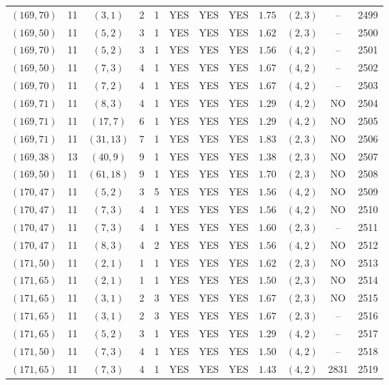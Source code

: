 \begin{longtable}{|c|c|c|c|c|c|c|c|c|c|c|c|}
$(169,70)$ & 11 & $(3,1)$ & 2 & 1 & YES & YES & YES & $1.75$ & $(2,3)$ & -- & 2499\\
$(169,50)$ & 11 & $(5,2)$ & 3 & 1 & YES & YES & YES & $1.62$ & $(2,3)$ & -- & 2500\\
$(169,70)$ & 11 & $(5,2)$ & 3 & 1 & YES & YES & YES & $1.56$ & $(4,2)$ & -- & 2501\\
$(169,50)$ & 11 & $(7,3)$ & 4 & 1 & YES & YES & YES & $1.67$ & $(4,2)$ & -- & 2502\\
$(169,70)$ & 11 & $(7,2)$ & 4 & 1 & YES & YES & YES & $1.67$ & $(4,2)$ & -- & 2503\\
$(169,71)$ & 11 & $(8,3)$ & 4 & 1 & YES & YES & YES & $1.29$ & $(4,2)$ & NO & 2504\\
$(169,71)$ & 11 & $(17,7)$ & 6 & 1 & YES & YES & YES & $1.29$ & $(4,2)$ & NO & 2505\\
$(169,71)$ & 11 & $(31,13)$ & 7 & 1 & YES & YES & YES & $1.83$ & $(2,3)$ & NO & 2506\\
$(169,38)$ & 13 & $(40,9)$ & 9 & 1 & YES & YES & YES & $1.38$ & $(2,3)$ & NO & 2507\\
$(169,50)$ & 11 & $(61,18)$ & 9 & 1 & YES & YES & YES & $1.70$ & $(2,3)$ & NO & 2508\\
$(170,47)$ & 11 & $(5,2)$ & 3 & 5 & YES & YES & YES & $1.56$ & $(4,2)$ & NO & 2509\\
$(170,47)$ & 11 & $(7,3)$ & 4 & 1 & YES & YES & YES & $1.56$ & $(4,2)$ & NO & 2510\\
$(170,47)$ & 11 & $(7,3)$ & 4 & 1 & YES & YES & YES & $1.60$ & $(2,3)$ & -- & 2511\\
$(170,47)$ & 11 & $(8,3)$ & 4 & 2 & YES & YES & YES & $1.56$ & $(4,2)$ & NO & 2512\\
$(171,50)$ & 11 & $(2,1)$ & 1 & 1 & YES & YES & YES & $1.62$ & $(2,3)$ & NO & 2513\\
$(171,65)$ & 11 & $(2,1)$ & 1 & 1 & YES & YES & YES & $1.50$ & $(2,3)$ & NO & 2514\\
$(171,65)$ & 11 & $(3,1)$ & 2 & 3 & YES & YES & YES & $1.67$ & $(2,3)$ & NO & 2515\\
$(171,65)$ & 11 & $(3,1)$ & 2 & 3 & YES & YES & YES & $1.67$ & $(2,3)$ & -- & 2516\\
$(171,65)$ & 11 & $(5,2)$ & 3 & 1 & YES & YES & YES & $1.29$ & $(4,2)$ & -- & 2517\\
$(171,50)$ & 11 & $(7,3)$ & 4 & 1 & YES & YES & YES & $1.50$ & $(4,2)$ & -- & 2518\\
$(171,65)$ & 11 & $(7,3)$ & 4 & 1 & YES & YES & YES & $1.43$ & $(4,2)$ & 2831 & 2519\\

\end{longtable}
